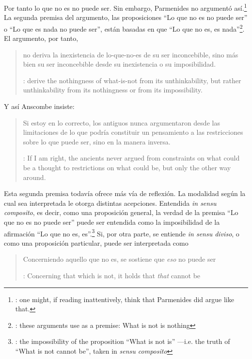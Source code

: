 {  Por tanto lo que no es no puede ser.} Sin embargo, Parmenides no argumentó así.\footnote{\cite[Cf.~][6]{anscombe1981parmenides:pmc}: \textelp{} one might, if reading inattentively, think that Parmenides did argue like that.} La segunda premisa del argumento, las proposiciones \enquote{Lo que no es no puede ser} o \enquote{Lo que es nada no puede ser}, están basadas en que \enquote{Lo que no es, es nada}\footnote{\cite[Cf.~][vii]{anscombe1981parmenides}: these arguments \textelp{} use as a premise: What is not is nothing}. El argumento, por tanto, \blockquote[{\cite[vii]{anscombe1981parmenides}}:  derive the nothingness of what-is-not from its unthinkability, but rather unthinkability from its nothingness or from its impossibility.]{no deriva la inexistencia de lo-que-no-es de su ser inconcebible, sino más bien su ser inconcebible desde su inexistencia o su imposibilidad.} Y así Anscombe insiste: \blockquote[{\cite[viii]{anscombe1981parmenides}}: If I am right, the ancients never argued from constraints on what could be a thought to restrictions on what could be, but only the other way around.]{Si estoy en lo correcto, los antiguos nunca argumentaron desde las limitaciones de lo que podría constituir un pensamiento a las restricciones sobre lo que puede ser, sino en la manera inversa.}

Esta segunda premisa todavía ofrece más vía de reflexión. La modalidad según la cual sea interpretada le otorga distintas acepciones. Entendida \emph{in sensu composito}, es decir, como una proposición general, la verdad de la premisa \enquote{Lo que no es no puede ser} puede ser entendida como la imposibilidad de la afirmación \enquote{Lo que no es, es}.\footnote{\cite[Cf.~][vii]{anscombe1981parmenides}: \textelp{} the impossibility of the proposition ``What is not is'' ---i.e. the truth of ``What is not cannot be'', taken in \emph{sensu composito}} Si, por otra parte, se entiende \emph{in sensu diviso}, o como una proposición particular, puede ser interpretada como \blockquote[{\cite[3]{anscombe1981parmenides:pmc}}: Concerning that which is not, it holds that \emph{that} cannot be]{Concerniendo aquello que no es, se sostiene que \emph{eso} no puede ser}.

